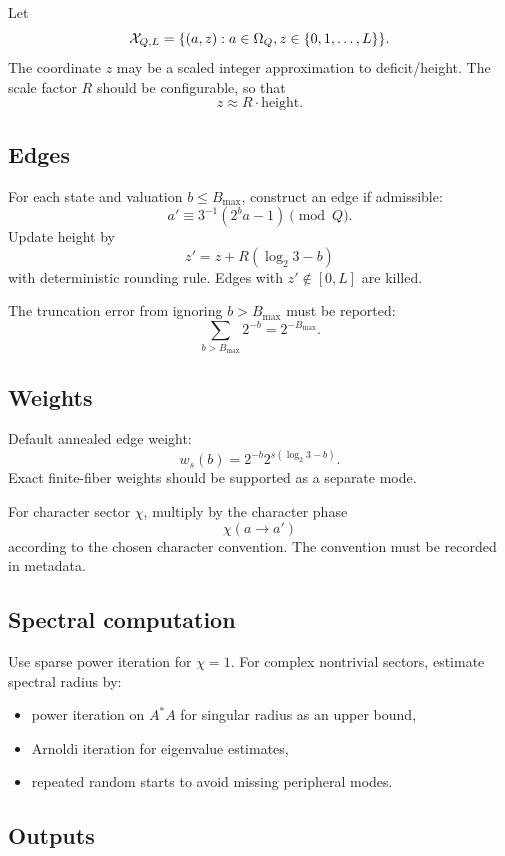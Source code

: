 \documentclass[11pt]{article}
\newcommand{\calX}{\mathcal X}
\begin{document}
Let
\[
        \calX_{Q,L}=\{(a,z):a\in\Omega_Q,\\ z\in\{0,1,\ldots,L\}\}.
\]
The coordinate \(z\) may be a scaled integer approximation to deficit/height.  The scale factor \(R\) should be configurable, so that
\[
        z \approx R\cdot \text{height}.
\]

\subsection{Edges}

For each state and valuation \(b\le B_{\max}\), construct an edge if admissible:
\[
        a'\equiv 3^{-1}(2^b a-1)\pmod Q.
\]
Update height by
\[
        z'=z+R(\log_2 3-b)
\]
with deterministic rounding rule.  Edges with \(z'\notin[0,L]\) are killed.

The truncation error from ignoring \(b>B_{\max}\) must be reported:
\[
        \sum_{b>B_{\max}}2^{-b}=2^{-B_{\max}}.
\]

\subsection{Weights}

Default annealed edge weight:
\[
        w_s(b)=2^{-b}2^{s(\log_2 3-b)}.
\]
Exact finite-fiber weights should be supported as a separate mode.

For character sector \(\chi\), multiply by the character phase
\[
        \chi(a\to a')
\]
according to the chosen character convention.  The convention must be recorded in metadata.

\subsection{Spectral computation}

Use sparse power iteration for \(\chi=1\).  For complex nontrivial sectors, estimate spectral radius by:
\begin{itemize}
\item power iteration on \(A^*A\) for singular radius as an upper bound,
\item Arnoldi iteration for eigenvalue estimates,
\item repeated random starts to avoid missing peripheral modes.
\end{itemize}

\subsection{Outputs}
\end{document}
